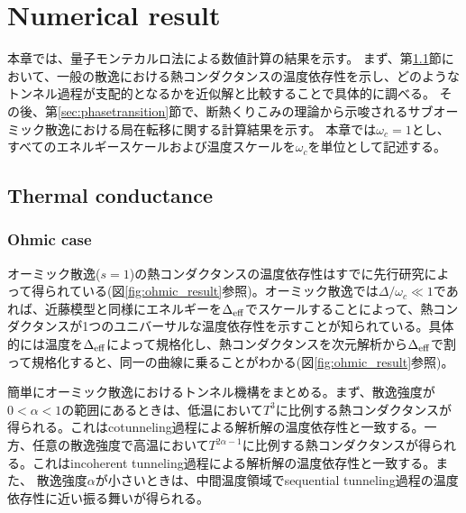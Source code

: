 \section{Numerical result}

本章では、量子モンテカルロ法による数値計算の結果を示す。
まず、第\ref{sec:conductance}節において、一般の散逸における熱コンダクタンスの温度依存性を示し、どのようなトンネル過程が支配的となるかを近似解と比較することで具体的に調べる。
その後、第\ref{sec:phasetransition}節で、断熱くりこみの理論から示唆されるサブオーミック散逸における局在転移に関する計算結果を示す。
本章では$\omega_c=1$とし、すべてのエネルギースケールおよび温度スケールを$\omega_c$を単位として記述する。
\subsection{Thermal conductance}
\label{sec:conductance}

\subsubsection{Ohmic case}

オーミック散逸($s=1$)の熱コンダクタンスの温度依存性はすでに先行研究\cite{SaitoKato13}によって得られている(図\ref{fig:ohmic_result}参照)。オーミック散逸では$\Delta/\omega_c \ll 1$であれば、近藤模型と同様にエネルギーを$\Delta_{\rm eff}$でスケールすることによって、熱コンダクタンスが1つのユニバーサルな温度依存性を示すことが知られている。具体的には温度を$\Delta_{\rm eff}$によって規格化し、熱コンダクタンスを次元解析から$\Delta_{\rm eff}$で割って規格化すると、同一の曲線に乗ることがわかる(図\ref{fig:ohmic_result}参照)。

簡単にオーミック散逸におけるトンネル機構をまとめる。まず、散逸強度が$0<\alpha<1$の範囲にあるときは、低温において$T^3$に比例する熱コンダクタンスが得られる。これはcotunneling過程による解析解の温度依存性と一致する。一方、任意の散逸強度で高温において$T^{2\alpha -1}$に比例する熱コンダクタンスが得られる。これはincoherent tunneling過程による解析解の温度依存性と一致する。また、 散逸強度$\alpha$が小さいときは、中間温度領域でsequential tunneling過程の温度依存性に近い振る舞いが得られる。


